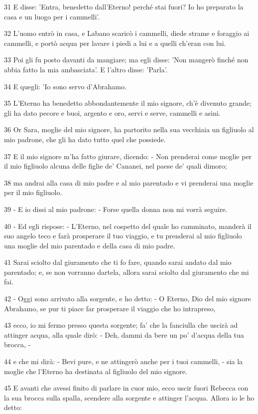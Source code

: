 \par 31 E disse: 'Entra, benedetto dall'Eterno! perché stai fuori? Io ho preparato la casa e un luogo per i cammelli'.
\par 32 L'uomo entrò in casa, e Labano scaricò i cammelli, diede strame e foraggio ai cammelli, e portò acqua per lavare i piedi a lui e a quelli ch'eran con lui.
\par 33 Poi gli fu posto davanti da mangiare; ma egli disse: 'Non mangerò finché non abbia fatto la mia ambasciata'. E l'altro disse: 'Parla'.
\par 34 E quegli: 'Io sono servo d'Abrahamo.
\par 35 L'Eterno ha benedetto abbondantemente il mio signore, ch'è divenuto grande; gli ha dato pecore e buoi, argento e oro, servi e serve, cammelli e asini.
\par 36 Or Sara, moglie del mio signore, ha partorito nella sua vecchiaia un figliuolo al mio padrone, che gli ha dato tutto quel che possiede.
\par 37 E il mio signore m'ha fatto giurare, dicendo: - Non prenderai come moglie per il mio figliuolo alcuna delle figlie de' Cananei, nel paese de' quali dimoro;
\par 38 ma andrai alla casa di mio padre e al mio parentado e vi prenderai una moglie per il mio figliuolo.
\par 39 - E io dissi al mio padrone: - Forse quella donna non mi vorrà seguire.
\par 40 - Ed egli rispose: - L'Eterno, nel cospetto del quale ho camminato, manderà il suo angelo teco e farà prosperare il tuo viaggio, e tu prenderai al mio figliuolo una moglie del mio parentado e della casa di mio padre.
\par 41 Sarai sciolto dal giuramento che ti fo fare, quando sarai andato dal mio parentado; e, se non vorranno dartela, allora sarai sciolto dal giuramento che mi fai.
\par 42 - Oggi sono arrivato alla sorgente, e ho detto: - O Eterno, Dio del mio signore Abrahamo, se pur ti piace far prosperare il viaggio che ho intrapreso,
\par 43 ecco, io mi fermo presso questa sorgente; fa' che la fanciulla che uscirà ad attinger acqua, alla quale dirò: - Deh, dammi da bere un po' d'acqua della tua brocca, -
\par 44 e che mi dirà: - Bevi pure, e ne attingerò anche per i tuoi cammelli, - sia la moglie che l'Eterno ha destinata al figliuolo del mio signore.
\par 45 E avanti che avessi finito di parlare in cuor mio, ecco uscir fuori Rebecca con la sua brocca sulla spalla, scendere alla sorgente e attinger l'acqua. Allora io le ho detto:
